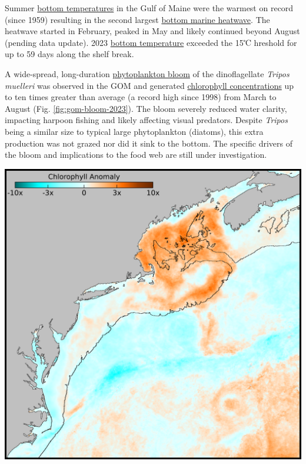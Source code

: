 \documentclass[
  10pt,
]{article}
\let\origfigure\figure
\let\endorigfigure\endfigure
\renewenvironment{figure}[1][2] {
    \expandafter\origfigure\expandafter[H]
} {
    \endorigfigure
}
\begin{document}
Summer \href{https://noaa-edab.github.io/catalog/bottom-temperature---seasonal-anomaly.html}{bottom temperatures} in the Gulf of Maine were the warmest on record (since 1959) resulting in the second largest \href{https://noaa-edab.github.io/catalog/marine-heatwaves---bottom.html}{bottom marine heatwave}. The heatwave started in February, peaked in May and likely continued beyond August (pending data update). 2023 \href{https://noaa-edab.github.io/catalog/thermal-habitat-persistence.html}{bottom temperature} exceeded the 15℃ hreshold for up to 59 days along the shelf break.

A wide-spread, long-duration \href{https://noaa-edab.github.io/catalog/observation-synthesis.html}{phytoplankton bloom} of the dinoflagellate \emph{Tripos muelleri} was observed in the GOM and generated \href{https://noaa-edab.github.io/catalog/chlorophyll-and-primary-production.html}{chlorophyll concentrations} up to ten times greater than average (a record high since 1998) from March to August (Fig. \ref{fig:gom-bloom-2023}). The bloom severely reduced water clarity, impacting harpoon fishing and likely affecting visual predators. Despite \emph{Tripos} being a similar size to typical large phytoplankton (diatoms), this extra production was not grazed nor did it sink to the bottom. The specific drivers of the bloom and implications to the food web are still under investigation.

\begin{figure}

{\centering \includegraphics[width=0.6\linewidth]{SOE-NEFMC_files/figure-latex/gom-bloom-2023-1} 

}

\caption{The chlorophyll anomaly for June 2023. Chlorophyll concentrations in the Gulf of Maine were 5-10 times greater than the long-term June average.}\label{fig:gom-bloom-2023}
\end{figure}
\end{document}
